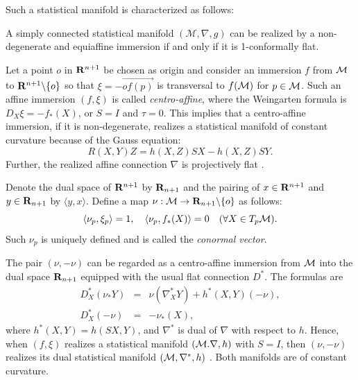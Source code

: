 \documentclass{llncs}
\begin{document}
 

Such a statistical manifold is characterized as follows:
\begin{proposition} \cite{Kurose94}
\label{Tohoku}
A simply connected statistical manifold
$(\mathcal{M},\nabla,g)$ can be realized by a non-degenerate and 
equiaffine immersion 
if and only if it is 1-conformally flat. 
\end{proposition}

Let a point $o$ in ${\bf R}^{n+1}$ be chosen as origin and 
consider an immersion $f$ from ${\cal M}$ to 
${\bf R}^{n+1} \backslash \{ o \}$ so that $\xi=-\overrightarrow{of(p)}$ is 
transversal to $f({\cal M})$ for $p \in {\cal M}$.
Such an affine immersion $(f,\xi)$ 
is called {\em centro-affine}, where 
the Weingarten formula is $D_X \xi =- f_*(X)$, 
or $S= I$ and $\tau=0$.
This implies that a centro-affine immersion, if it is non-degenerate, 
realizes a statistical manifold of constant curvature  
because of the Gauss equation:
\[
	R(X,Y)Z=h(X,Z)SX-h(X,Z)SY.
\]
Further, the realized affine connection $\nabla$ is projectively flat \cite{NS}.

Denote the dual space of ${\bf R}^{n+1}$ by ${\bf R}_{n+1}$ and 
the pairing of $x \in {\bf R}^{n+1}$ and $y \in {\bf R}_{n+1}$ by 
$\langle y, x \rangle$.
Define a map $\nu: {\cal M} \rightarrow {\bf R}_{n+1} \backslash \{o\}$ 
as follows:
\[
	\langle \nu_p, \xi_p \rangle =1, \quad 
	\langle \nu_p, f_*(X) \rangle =0 \quad (\forall X \in T_p {\cal M}).
\]
Such $\nu_p$ is uniquely defined and is called the {\em conormal vector}.

The pair $(\nu, -\nu)$ can be regarded as a centro-affine immersion 
from ${\cal M}$ into 
the dual space ${\bf R}_{n+1}$ equipped with the usual flat connection $D^*$.
The formulas are
\begin{eqnarray*}
	D^*_X(\nu_* Y)&=&\nu(\nabla^*_X Y)+h^*(X,Y)(-\nu), \\
	D^*_X (-\nu) &=& - \nu_*(X), 
\end{eqnarray*}
where $h^*(X,Y)=h(SX,Y)$, and $\nabla^*$ is dual of 
$\nabla$ with respect to $h$.
Hence, when $(f,\xi)$ realizes a statistical manifold $({\cal M}.\nabla,h)$ 
with $S=I$, then 
$(\nu, -\nu)$ realizes its dual statistical manifold 
$({\cal M}, \nabla^*, h)$ \cite{NS}.
Both manifolds are of constant curvature.
\end{document}
